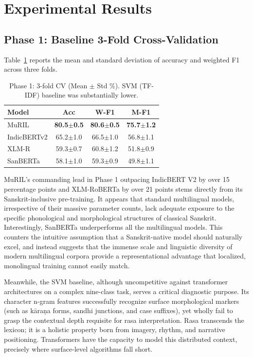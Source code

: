 \documentclass[11pt]{article}
\begin{document}
\section{Experimental Results}

\subsection{Phase 1: Baseline 3-Fold Cross-Validation}

Table~\ref{tab:phase1_results} reports the mean and standard deviation of accuracy and weighted F1 across three folds.

\begin{table}[htbp]
\centering
\small
\caption{Phase 1: 3-fold CV (Mean $\pm$ Std \%). SVM (TF-IDF) baseline was substantially lower.}
\label{tab:phase1_results}
\begin{tabular}{@{}lccc@{}}
\toprule
Model & Acc & W-F1 & M-F1 \\
\midrule
MuRIL        & \textbf{80.5$\pm$0.5} & \textbf{80.6$\pm$0.5} & \textbf{75.7$\pm$1.2} \\
IndicBERTv2  & 65.2$\pm$1.0          & 66.5$\pm$1.0          & 56.8$\pm$1.1          \\
XLM-R        & 59.3$\pm$0.7          & 60.8$\pm$1.2          & 51.8$\pm$0.9          \\
SanBERTa     & 58.1$\pm$1.0          & 59.3$\pm$0.9          & 49.8$\pm$1.1          \\
\bottomrule
\end{tabular}
\end{table}

MuRIL's commanding lead in Phase 1 outpacing IndicBERT V2 by over 15 percentage points and XLM-RoBERTa by over 21 points stems directly from its Sanskrit-inclusive pre-training. It appears that standard multilingual models, irrespective of their massive parameter counts, lack adequate exposure to the specific phonological and morphological structures of classical Sanskrit. Interestingly, SanBERTa underperforms all the multilingual models. This counters the intuitive assumption that a Sanskrit-native model should naturally excel, and instead suggests that the immense scale and linguistic diversity of modern multilingual corpora provide a representational advantage that localized, monolingual training cannot easily match.

Meanwhile, the SVM baseline, although uncompetitive against transformer architectures on a complex nine-class task, serves a critical diagnostic purpose. Its character n-gram features successfully recognize surface morphological markers (such as k\=ara\d na forms, sandhi junctions, and case suffixes), yet wholly fail to grasp the contextual depth requisite for rasa interpretation. Rasa transcends the lexicon; it is a holistic property born from imagery, rhythm, and narrative positioning. Transformers have the capacity to model this distributed context, precisely where surface-level algorithms fall short.
\end{document}
